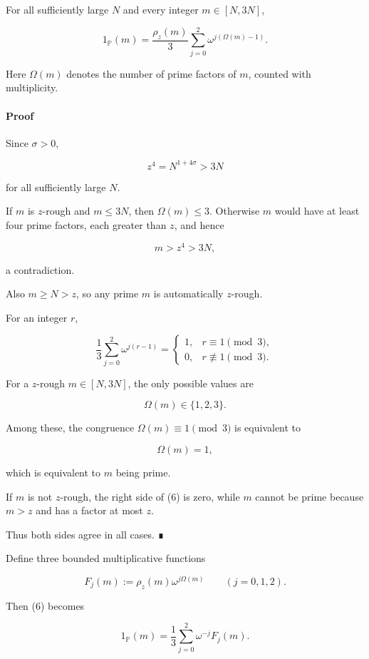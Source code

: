 For all sufficiently large \(N\) and every integer \(m\in[N,3N]\),

\[
\boxed{
1_{\mathbb P}(m)
=
\frac{\rho_z(m)}3
\sum_{j=0}^{2}\omega^{j(\Omega(m)-1)}.
}
\tag{6}
\]

Here \(\Omega(m)\) denotes the number of prime factors of \(m\), counted with multiplicity.

\paragraph{Proof}

Since \(\sigma>0\),

\[
z^4=N^{1+4\sigma}>3N
\]

for all sufficiently large \(N\).

If \(m\) is \(z\)-rough and \(m\le3N\), then \(\Omega(m)\le3\). Otherwise \(m\) would have at least four prime factors, each greater than \(z\), and hence

\[
m>z^4>3N,
\]

a contradiction.

Also \(m\ge N>z\), so any prime \(m\) is automatically \(z\)-rough.

For an integer \(r\),

\[
\frac13\sum_{j=0}^2\omega^{j(r-1)}
=
\begin{cases}
1,&r\equiv1\pmod3,\\
0,&r\not\equiv1\pmod3.
\end{cases}
\]

For a \(z\)-rough \(m\in[N,3N]\), the only possible values are

\[
\Omega(m)\in\{1,2,3\}.
\]

Among these, the congruence \(\Omega(m)\equiv1\pmod3\) is equivalent to

\[
\Omega(m)=1,
\]

which is equivalent to \(m\) being prime.

If \(m\) is not \(z\)-rough, the right side of (6) is zero, while \(m\) cannot be prime because \(m>z\) and has a factor at most \(z\).

Thus both sides agree in all cases. ∎

Define three bounded multiplicative functions

\[
F_j(m):=\rho_z(m)\omega^{j\Omega(m)}
\qquad(j=0,1,2).
\]

Then (6) becomes

\[
1_{\mathbb P}(m)
=
\frac13
\sum_{j=0}^2\omega^{-j}F_j(m).
\tag{7}
\]

